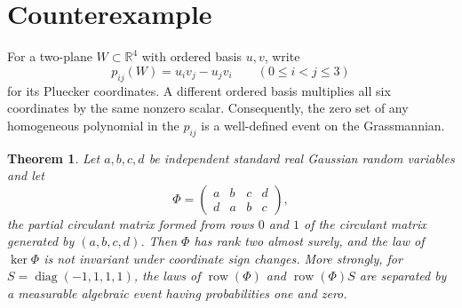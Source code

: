 \documentclass[11pt]{article}
\newtheorem{theorem}{Theorem}
\newcommand{\R}{\mathbb R}
\newcommand{\row}{\operatorname{row}}
\begin{document}
\section{Counterexample}

For a two-plane $W\subset\R^4$ with ordered basis $u,v$, write
\[
 p_{ij}(W)=u_i v_j-u_jv_i\qquad(0\leq i<j\leq3)
\]
for its Pluecker coordinates.  A different ordered basis multiplies all six
coordinates by the same nonzero scalar.  Consequently, the zero set of any
homogeneous polynomial in the $p_{ij}$ is a well-defined event on the
Grassmannian.

\begin{theorem}\label{thm:main}
Let $a,b,c,d$ be independent standard real Gaussian random variables and let
\[
 \Phi=\begin{pmatrix}
 a&b&c&d\\
 d&a&b&c
 \end{pmatrix},
\]
the partial circulant matrix formed from rows $0$ and $1$ of the circulant
matrix generated by $(a,b,c,d)$.  Then $\Phi$ has rank two almost surely, and
the law of $\ker\Phi$ is not invariant under coordinate sign changes.  More
strongly, for $S=\operatorname{diag}(-1,1,1,1)$, the laws of
$\row(\Phi)$ and $\row(\Phi)S$ are separated by a measurable algebraic event
having probabilities one and zero.
\end{theorem}
\end{document}
